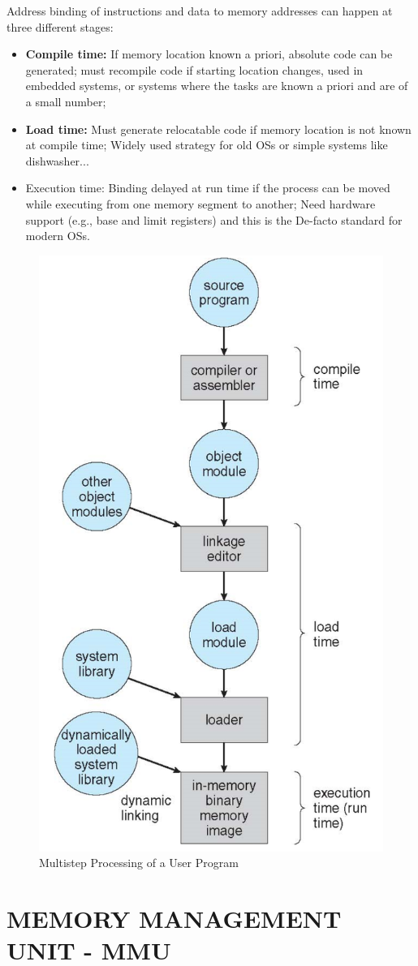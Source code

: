 Address binding of instructions and data to memory addresses can happen at three different stages:

\begin{itemize}
    \item \textbf{Compile time:} If memory location known a priori, absolute code can be generated; must recompile code if starting location changes, used in embedded systems, or systems where the tasks are known a priori and are of a small number;

    \item \textbf{Load time:} Must generate relocatable code if memory location
is not known at compile time; Widely used strategy for old OSs or simple systems like dishwasher...


    \item Execution time: Binding delayed at run time if the process can
be moved while executing from one memory segment to another; Need hardware support (e.g., base and limit registers) and this is the De-facto standard for modern OSs.

\end{itemize}


\begin{figure}[htbp]
    \centering
    \includegraphics[width=0.4\linewidth]{img/rwefbg.png}
    \caption{Multistep Processing of a User Program }
\end{figure}


\newpage
\section{MEMORY MANAGEMENT UNIT - MMU}

